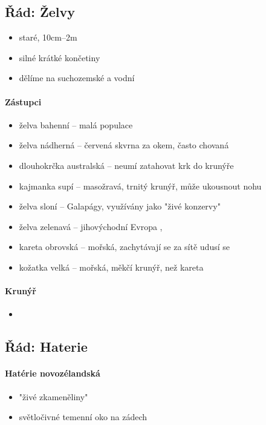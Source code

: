 \subsection{Řád: Želvy}
\begin{itemize}
\item staré, 10cm--2m
\item silné krátké končetiny
\item dělíme na suchozemské a vodní
\end{itemize}

\paragraph{Zástupci}
\begin{itemize}
\item želva bahenní -- malá populace
\item želva nádherná -- červená skvrna za okem, často chovaná
\item dlouhokrčka australská -- neumí zatahovat krk do krunýře
\item kajmanka supí -- masožravá, trnitý krunýř, může ukousnout nohu
\item želva sloní -- Galapágy, využívány jako "živé konzervy"
\item želva zelenavá -- jihovýchodní Evropa , 
\item kareta obrovská -- mořská, zachytávají se za sítě \ra udusí se
\item kožatka velká -- mořská, měkčí krunýř, než kareta
\end{itemize}

\paragraph{Krunýř}
\begin{itemize}
\item 
\end{itemize}


\subsection{Řád: Haterie}
\paragraph{Hatérie novozélandská}
\begin{itemize}
\item "živé zkameněliny"
\item světločivné temenní oko na zádech
\end{itemize}


